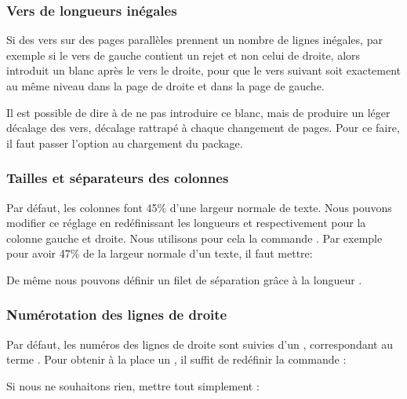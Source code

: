 \subsubsection{Vers de longueurs inégales}

Si des vers sur des pages parallèles prennent un nombre de lignes inégales, par exemple si le vers de gauche contient un rejet et non  celui de droite, alors  introduit un blanc après le vers le droite, pour que le vers suivant soit exactement au même niveau dans la page de droite et dans la page de gauche.

Il est possible de dire à  de ne pas introduire ce blanc, mais de produire un léger décalage des vers, décalage rattrapé à chaque changement de pages. Pour ce faire, il faut passer l'option  au chargement du package.

\begin{latexcode}
\usepackage[shiftedverses]{ledpar}
\end{latexcode}
 
 \subsubsection{Tailles et séparateurs des colonnes}

Par défaut, les colonnes font 45\% d'une largeur normale de texte. Nous pouvons modifier ce réglage en redéfinissant les longueurs  et  respectivement pour la colonne gauche et droite. Nous utilisons pour cela la commande . Par exemple pour avoir 47\% de la largeur normale d'un texte, il faut mettre:

\begin{latexcode}
\setlength{\Lcolwidth}{0.47\textwidth}
\setlength{\Rcolwidth}{0.47\textwidth}
\end{latexcode}

De même nous pouvons définir un filet de séparation grâce à la longueur .

\begin{latexcode}
\setlength{columnrulewidth}{0.4pt}
\end{latexcode}


\subsubsection{Numérotation des lignes de droite}

Par défaut, les numéros des lignes de droite sont suivies d'un , correspondant au terme . Pour obtenir à la place un , il suffit de redéfinir la commande  :

\begin{latexcode}
\renewcommand{\Rlineflag}{D}
\end{latexcode}

Si nous ne souhaitons  rien, mettre tout simplement :


\begin{latexcode}
\renewcommand{\Rlineflag}{}
\end{latexcode}




